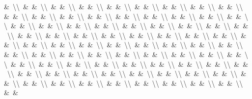 \documentclass[
  ukrainian,
]{article}
\begin{document}
\&\ \textbackslash{}\textbackslash{}\ \&\ \&\ \textbackslash{}\textbackslash{}\ \&\ \&\ \textbackslash{}\textbackslash{}\ \&\ \&\ \textbackslash{}\textbackslash{}\ \&\ \&\ \textbackslash{}\textbackslash{}\ \&\ \&\ \textbackslash{}\textbackslash{}\ \&\ \&\ \textbackslash{}\textbackslash{}\ \&\ \&\ \textbackslash{}\textbackslash{}\ \&\ \&\ \textbackslash{}\textbackslash{}\ \&\ \&\ \textbackslash{}\textbackslash{}\ \&\ \&\ \textbackslash{}\textbackslash{}\ \&\ \&\ \textbackslash{}\textbackslash{}\ \&\ \&\ \textbackslash{}\textbackslash{}\ \&\ \&\ \textbackslash{}\textbackslash{}\ \&\ \&\ \textbackslash{}\textbackslash{}\ \&\ \&\ \textbackslash{}\textbackslash{}\ \&\ \&\ \textbackslash{}\textbackslash{}\ \&\ \&\ \textbackslash{}\textbackslash{}\ \&\ \&\ \textbackslash{}\textbackslash{}\ \&\ \&\ \textbackslash{}\textbackslash{}\ \&\ \&\ \textbackslash{}\textbackslash{}\ \&\ \&\ \textbackslash{}\textbackslash{}\ \&\ \&\ \textbackslash{}\textbackslash{}\ \&\ \&\ \textbackslash{}\textbackslash{}\ \&\ \&\ \textbackslash{}\textbackslash{}\ \&\ \&\ \textbackslash{}\textbackslash{}\ \&\ \&\ \textbackslash{}\textbackslash{}\ \&\ \&\ \textbackslash{}\textbackslash{}\ \&\ \&\ \textbackslash{}\textbackslash{}\ \&\ \&\ \textbackslash{}\textbackslash{}\ \&\ \&\ \textbackslash{}\textbackslash{}\ \&\ \&\ \textbackslash{}\textbackslash{}\ \&\ \&\ \textbackslash{}\textbackslash{}\ \&\ \&\ \textbackslash{}\textbackslash{}\ \&\ \&\ \textbackslash{}\textbackslash{}\ \&\ \&\ \textbackslash{}\textbackslash{}\ \&\ \&\ \textbackslash{}\textbackslash{}\ \&\ \&\ \textbackslash{}\textbackslash{}\ \&\ \&\ \textbackslash{}\textbackslash{}\ \&\ \&\ \textbackslash{}\textbackslash{}\ \&\ \&\ \textbackslash{}\textbackslash{}\ \&\ \&\ \textbackslash{}\textbackslash{}\ \&\ \&\ \textbackslash{}\textbackslash{}\ \&\ \&\ \textbackslash{}\textbackslash{}\ \&\ \&\ \textbackslash{}\textbackslash{}\ \&\ \&\ \textbackslash{}\textbackslash{}\ \&\ \&\ \textbackslash{}\textbackslash{}\ \&\ \&\ \textbackslash{}\textbackslash{}\ \&\ \&\ \textbackslash{}\textbackslash{}\ \&\ \&\ \textbackslash{}\textbackslash{}\ \&\ \&\ \textbackslash{}\textbackslash{}\ \&\ \&\ \textbackslash{}\textbackslash{}\ \&\ \&\ \textbackslash{}\textbackslash{}\ \&\ \&\ \textbackslash{}\textbackslash{}\ \&\ \&\ \textbackslash{}\textbackslash{}\ \&\ \&\ \textbackslash{}\textbackslash{}\ \&\ \&\ \textbackslash{}\textbackslash{}\ \&\ \&\ \textbackslash{}\textbackslash{}\ \&\ \&\ \textbackslash{}\textbackslash{}\ \&\ \&\ \textbackslash{}\textbackslash{}\ \&\ \&\ \textbackslash{}\textbackslash{}\ \&\ \&\ \textbackslash{}\textbackslash{}\ \&\ \&\ \textbackslash{}\textbackslash{}\ \&\ \&\ \textbackslash{}\textbackslash{}\ \&\ \&\ \textbackslash{}\textbackslash{}\ \&\ \&\ \textbackslash{}\textbackslash{}\ \&\ \&\ \textbackslash{}\textbackslash{}\ \&\ \&\ \textbackslash{}\textbackslash{}\ \&\ \&\ \textbackslash{}\textbackslash{}\ \&\ \&\ \textbackslash{}\textbackslash{}\ \&\ \&\ \textbackslash{}\textbackslash{}\ \&\ \&\ \textbackslash{}\textbackslash{}\ \&\ \&\ \textbackslash{}\textbackslash{}\ \&\ \&\ \textbackslash{}\textbackslash{}\ \&\ \&\ \textbackslash{}\textbackslash{}\ \&\ \&\ \textbackslash{}\textbackslash{}\ \&\ \&\ \textbackslash{}\textbackslash{}\ \&\ \&\ \textbackslash{}\textbackslash{}\ \&\ \&\ \textbackslash{}\textbackslash{}\ \&\ \&\ 
\end{document}
